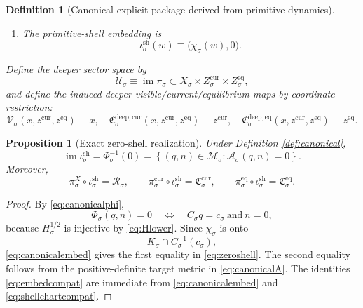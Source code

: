 \documentclass[11pt]{article}
\newcommand{\Reduction}[1]{\mathcal R_{#1}}
\newcommand{\CurrentCarrier}[1]{\mathfrak C_{#1}^{\mathrm{cur}}}
\newcommand{\EqCarrier}[1]{\mathfrak C_{#1}^{\mathrm{eq}}}
\newcommand{\SubSpace}[1]{\mathcal M_{#1}}
\newcommand{\DataProj}[1]{\pi_{#1}}
\newcommand{\SubVisible}[1]{\pi_{#1}^{X}}
\newcommand{\SubCurrent}[1]{\pi_{#1}^{\mathrm{cur}}}
\newcommand{\SubEq}[1]{\pi_{#1}^{\mathrm{eq}}}
\newcommand{\ShellEquation}[1]{\Phi_{#1}}
\newcommand{\ShellEmbed}[1]{\iota_{#1}^{\mathrm{sh}}}
\newcommand{\StationaryFunctional}[1]{\mathscr A_{#1}}
\newcommand{\DeepSpace}[1]{\mathcal U_{#1}}
\newcommand{\VisibleMap}[1]{\mathcal V_{#1}}
\newcommand{\DeepCurrentCarrier}[1]{\mathfrak C_{#1}^{\mathrm{deep,cur}}}
\newcommand{\DeepEqCarrier}[1]{\mathfrak C_{#1}^{\mathrm{deep,eq}}}
\newcommand{\CoordBody}[1]{K_{#1}}
\newcommand{\ConstraintMap}[1]{C_{#1}}
\newcommand{\ConstraintValue}[1]{c_{#1}}
\newcommand{\NormalOperator}[1]{H_{#1}}
\newcommand{\ShellChart}[1]{\chi_{#1}}
\newtheorem{definition}{Definition}
\newtheorem{proposition}{Proposition}
\begin{document}
\begin{definition}[Canonical explicit package derived from primitive dynamics]
\begin{enumerate}
\begin{equation}
    \bigr)
    =
    \frac12\|\ConstraintMap{\sigma}q-\ConstraintValue{\sigma}\|^{2}
    +
    \frac12\ev{n,\NormalOperator{\sigma}n}.
    \label{eq:canonicalA}
    \end{equation}
    \item The primitive-shell embedding is
    \begin{equation}
    \ShellEmbed{\sigma}(w)
    \equiv
    \bigl(
    \ShellChart{\sigma}(w),
    0
    \bigr).
    \label{eq:canonicalembed}
    \end{equation}
\end{enumerate}
Define the deeper sector space by
\begin{equation}
\DeepSpace{\sigma}
\equiv
\operatorname{im}\DataProj{\sigma}
\subset
X_{\sigma}\times Z_{\sigma}^{\mathrm{cur}}\times Z_{\sigma}^{\mathrm{eq}},
\label{eq:deepspace}
\end{equation}
and define the induced deeper visible/current/equilibrium maps by coordinate restriction:
\begin{equation}
\VisibleMap{\sigma}(x,z^{\mathrm{cur}},z^{\mathrm{eq}})\equiv x,
\quad
\DeepCurrentCarrier{\sigma}(x,z^{\mathrm{cur}},z^{\mathrm{eq}})
\equiv z^{\mathrm{cur}},
\quad
\DeepEqCarrier{\sigma}(x,z^{\mathrm{cur}},z^{\mathrm{eq}})
\equiv z^{\mathrm{eq}}.
\label{eq:deepcoords}
\end{equation}
\end{definition}

\begin{proposition}[Exact zero-shell realization]
\label{prop:zeroshell}
Under Definition \ref{def:canonical},
\begin{equation}
\operatorname{im}\ShellEmbed{\sigma}
=
\ShellEquation{\sigma}^{-1}(0)
=
\left\{
(q,n)\in\SubSpace{\sigma}:\StationaryFunctional{\sigma}(q,n)=0
\right\}.
\label{eq:zeroshell}
\end{equation}
Moreover,
\begin{equation}
\SubVisible{\sigma}\circ\ShellEmbed{\sigma}
=
\Reduction{\sigma},
\qquad
\SubCurrent{\sigma}\circ\ShellEmbed{\sigma}
=
\CurrentCarrier{\sigma},
\qquad
\SubEq{\sigma}\circ\ShellEmbed{\sigma}
=
\EqCarrier{\sigma}.
\label{eq:embedcompat}
\end{equation}
\end{proposition}

\begin{proof}
By \eqref{eq:canonicalphi},
\[
\ShellEquation{\sigma}(q,n)=0
\quad\Longleftrightarrow\quad
\ConstraintMap{\sigma}q=\ConstraintValue{\sigma}
\ \text{and}\ 
n=0,
\]
because \(\NormalOperator{\sigma}^{1/2}\) is injective by \eqref{eq:Hlower}. Since \(\ShellChart{\sigma}\) is onto
\[
\CoordBody{\sigma}\cap \ConstraintMap{\sigma}^{-1}(\ConstraintValue{\sigma}),
\]
\eqref{eq:canonicalembed} gives the first equality in \eqref{eq:zeroshell}. The second equality follows from the positive-definite target metric in \eqref{eq:canonicalA}. The identities \eqref{eq:embedcompat} are immediate from \eqref{eq:canonicalembed} and \eqref{eq:shellchartcompat}.
\end{proof}
\end{document}
